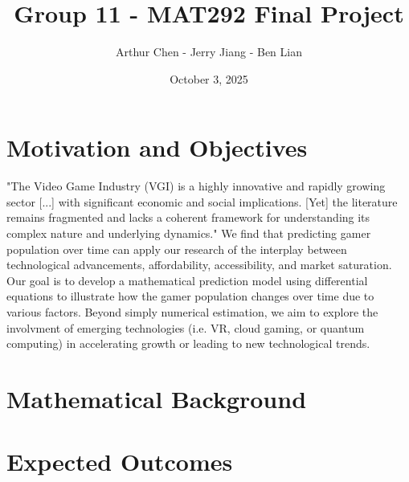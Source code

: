 \documentclass{article}
\title{\vspace{-4cm}Group 11 - MAT292 Final Project}
\author{Arthur Chen - Jerry Jiang - Ben Lian}
\date{October 3, 2025}
\begin{document}
\maketitle

\section{Motivation and Objectives}
"The Video Game Industry (VGI) is a highly innovative and rapidly growing 
sector [...] with significant economic and social implications. [Yet] the 
literature remains fragmented and lacks a coherent framework for 
understanding its complex nature and underlying dynamics." \cite{Goh2023} 
We find that predicting gamer population over time can apply our research 
of the interplay between technological advancements, affordability, 
accessibility, and market saturation.\\

\noindent Our goal is to develop a mathematical prediction model using 
differential equations to illustrate how the gamer population changes over 
time due to various factors. Beyond simply numerical estimation, we aim to 
explore the involvment of emerging technologies (i.e. VR, cloud gaming, or 
quantum computing) in accelerating growth or leading to new technological 
trends.

\section{Mathematical Background}



\section{Expected Outcomes}




\end{document}
